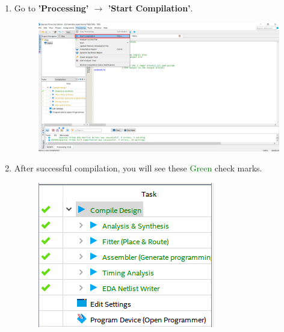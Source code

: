 \documentclass[12pt]{article}
\begin{document}
\begin{enumerate}
    \item Go to \textbf{'Processing'  $\rightarrow$ 'Start Compilation'}.
    \begin{figure}[H]
        \centering
    \includegraphics[width=14cm,keepaspectratio]{TWSCOM.png}
    \end{figure}
    
    \newpage
    
    \item After successful compilation, you will see these \textcolor{green}{Green} check marks.
    \begin{figure}[H]
        \centering
    \includegraphics[keepaspectratio]{check_marks.png}
    \end{figure}
\end{enumerate}

\newpage
\end{document}
